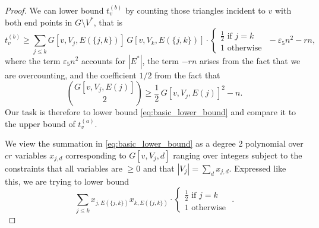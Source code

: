 \documentclass[a4paper,11pt]{article}
\numberwithin{equation}{section}
\begin{document}
\begin{proof}

       
    We can lower bound $t_v^{(b)}$ by counting those triangles incident to $v$ with both end points in $G\setminus V^\ast$, that is
    \begin{equation}
        \label{eq:basic_lower_bound}
        t_v^{(b)} \ge 
     \sum_{j\le k}
        G[v,V_j,E(\{j,k\})] \, G[v,V_k, E(\{j,k\})]
        \cdot\begin{cases}
            \frac{1}{2} \text{ if } j=k \\
            1 \text{ otherwise }
        \end{cases}-\varepsilon_5n^2
        -r n,
    \end{equation}
    where the term $\varepsilon_5n^2$ accounts for $|E^*|$, the term $-r n$ 
    arises from the fact that we are 
    overcounting, and the coefficient $1/2$ from the fact that
    \[
        \binom{G[v,V_j, E(j)]}{2}
        \ge
        \frac{1}{2} \, G[v,V_j, E(j)]^2 - n.
    \]
    Our task is therefore to lower bound
    \cref{eq:basic_lower_bound} and compare it to the upper bound of $t_v^{(a)}$.
    
    We view the summation in \cref{eq:basic_lower_bound} as a degree 2 polynomial over $cr$ variables $x_{j,d}$ corresponding to $G[v,V_j,d]$ ranging over integers subject to the constraints that all variables are $\ge 0$ and that $|V_j| = \sum_{d} x_{j,d}$. Expressed like this, we are trying to lower bound
    \begin{equation}
        \label{eq:polynomial_to_lower_bound}
        \sum_{j\le k}
        x_{j,E(\{j,k\})} x_{k,E(\{j,k\})}
        \cdot\begin{cases}
            \frac{1}{2} \text{ if } j=k \\
            1 \text{ otherwise }
        \end{cases}.
    \end{equation}
    

\end{proof}
\end{document}
